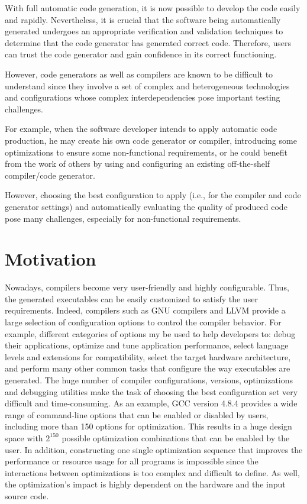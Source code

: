 With full automatic code generation, it is now possible to develop the code easily and rapidly. Nevertheless, it is crucial that the software being automatically generated undergoes an appropriate verification and validation techniques to determine that the code generator has generated correct code. Therefore, users can trust the code generator and gain confidence in its correct functioning.

However, code generators as well as compilers are known to be difficult to understand since they involve a set of complex and heterogeneous technologies and configurations whose complex interdependencies pose important testing challenges. 

For example, when the software developer intends to apply automatic code production, he may create his own code generator or compiler, introducing some optimizations to ensure some non-functional requirements, or he could benefit from the work of others by using and configuring an existing off-the-shelf compiler/code generator. 

However, choosing the best configuration to apply (i.e., for the compiler and code generator settings) and automatically evaluating the quality of produced code pose many challenges, especially for non-functional requirements.


\section{Motivation}

Nowadays, compilers become very user-friendly and highly configurable\cite{fursin2008milepost}. Thus, the generated executables can be easily customized to satisfy the user requirements. Indeed, compilers such as GNU compilers and LLVM provide a large selection of configuration options to control the compiler behavior. For example, different categories of options my be used to help developers to: debug their applications, optimize and tune application performance, select language levels and extensions for compatibility, select the target hardware architecture, and perform many other common tasks that configure the way executables are generated.
The huge number of compiler configurations, versions, optimizations and debugging utilities make the task of choosing the best configuration set very difficult and time-consuming. As an example, GCC version 4.8.4 provides a wide range of command-line options that can be enabled or disabled by users, including more than 150 options for optimization. This results in a huge design space with $2^{150}$ possible optimization combinations that can be enabled by the user. In addition, constructing one single optimization sequence that improves the performance or resource usage for all programs is impossible since the interactions between optimizations is too complex and difficult to define. As well, the optimization's impact is highly dependent on the hardware and the input source code.


